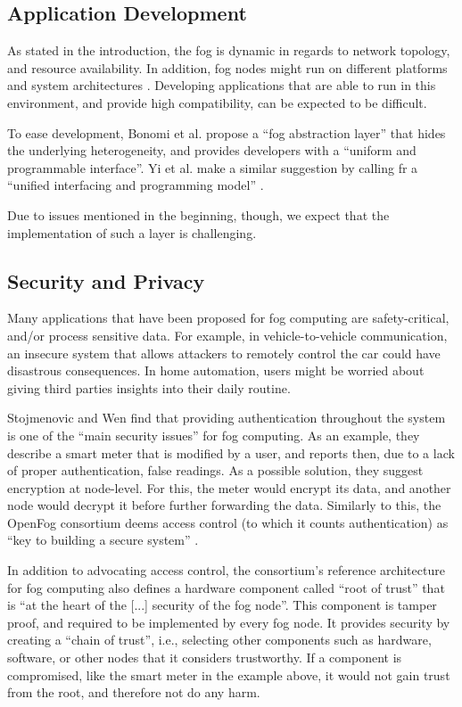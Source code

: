 \documentclass{article}
\begin{document}
\subsection{Application Development}
As stated in the introduction, the fog is dynamic in regards to network topology, and resource availability. In addition, fog nodes might run on different platforms and system architectures \cite{yi2015survey}. Developing applications that are able to run in this environment, and provide high compatibility, can be expected to be difficult. 

To ease development, Bonomi et al. \cite{bonomi2014fog} propose a ``fog abstraction layer'' that hides the underlying heterogeneity, and provides developers with a ``uniform and programmable interface''. Yi et al. make a similar suggestion by calling fr a ``unified interfacing and programming model'' \cite{yi2015survey}.

Due to issues mentioned in the beginning, though, we expect that the implementation of such a layer is challenging.


\subsection{Security and Privacy}
Many applications that have been proposed for fog computing are safety-critical, and/or process sensitive data. For example, in vehicle-to-vehicle communication, an insecure system that allows attackers to remotely control the car could have disastrous consequences. In home automation, users might be worried about giving third parties insights into their daily routine.

Stojmenovic and Wen \cite{stojmenovic2014fog} find that providing authentication throughout the system is one of the ``main security issues'' for fog computing. As an example, they describe a smart meter that is modified by a user, and reports then, due to a lack of proper authentication, false readings. As a possible solution, they suggest encryption at node-level. For this, the meter would encrypt its data, and another node would decrypt it before further forwarding the data. Similarly to this, the OpenFog consortium deems access control (to which it counts authentication) as ``key to building a secure system'' \cite{openfogconsortium2017}. 

In addition to advocating access control, the consortium's reference architecture for fog computing also defines a hardware component called ``root of trust'' that is ``at the heart of the [...] security of the fog node''. This component is tamper proof, and required to be implemented by every fog node. It provides security by creating a ``chain of trust'', i.e., selecting other components such as hardware, software, or other nodes that it considers trustworthy. If a component is compromised, like the smart meter in the example above, it would not gain trust from the root, and therefore not do any harm.
\end{document}
